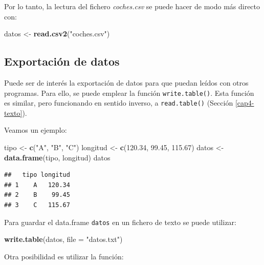 \documentclass[]{book}
\newenvironment{Shaded}{\begin{snugshade}}{\end{snugshade}}
\newcommand{\KeywordTok}[1]{\textcolor[rgb]{0.13,0.29,0.53}{\textbf{#1}}}
\newcommand{\DataTypeTok}[1]{\textcolor[rgb]{0.13,0.29,0.53}{#1}}
\newcommand{\FloatTok}[1]{\textcolor[rgb]{0.00,0.00,0.81}{#1}}
\newcommand{\StringTok}[1]{\textcolor[rgb]{0.31,0.60,0.02}{#1}}
\newcommand{\NormalTok}[1]{#1}
\begin{document}
Por lo tanto, la lectura del fichero \emph{coches.csv} se puede hacer de
modo más directo con:

\begin{Shaded}
\begin{Highlighting}[]
\NormalTok{datos <-}\StringTok{ }\KeywordTok{read.csv2}\NormalTok{(}\StringTok{"coches.csv"}\NormalTok{)}
\end{Highlighting}
\end{Shaded}

\subsection{Exportación de datos}\label{exportacion-de-datos}

Puede ser de interés la exportación de datos para que puedan leídos con
otros programas. Para ello, se puede emplear la función
\texttt{write.table()}. Esta función es similar, pero funcionando en
sentido inverso, a \texttt{read.table()} (Sección \ref{cap4-texto}).

Veamos un ejemplo:

\begin{Shaded}
\begin{Highlighting}[]
\NormalTok{tipo <-}\StringTok{ }\KeywordTok{c}\NormalTok{(}\StringTok{"A"}\NormalTok{, }\StringTok{"B"}\NormalTok{, }\StringTok{"C"}\NormalTok{)}
\NormalTok{longitud <-}\StringTok{ }\KeywordTok{c}\NormalTok{(}\FloatTok{120.34}\NormalTok{, }\FloatTok{99.45}\NormalTok{, }\FloatTok{115.67}\NormalTok{)}
\NormalTok{datos <-}\StringTok{ }\KeywordTok{data.frame}\NormalTok{(tipo, longitud)}
\NormalTok{datos}
\end{Highlighting}
\end{Shaded}

\begin{verbatim}
##   tipo longitud
## 1    A   120.34
## 2    B    99.45
## 3    C   115.67
\end{verbatim}

Para guardar el data.frame \texttt{datos} en un fichero de texto se
puede utilizar:

\begin{Shaded}
\begin{Highlighting}[]
\KeywordTok{write.table}\NormalTok{(datos, }\DataTypeTok{file =} \StringTok{"datos.txt"}\NormalTok{)}
\end{Highlighting}
\end{Shaded}

Otra posibilidad es utilizar la función:
\end{document}
